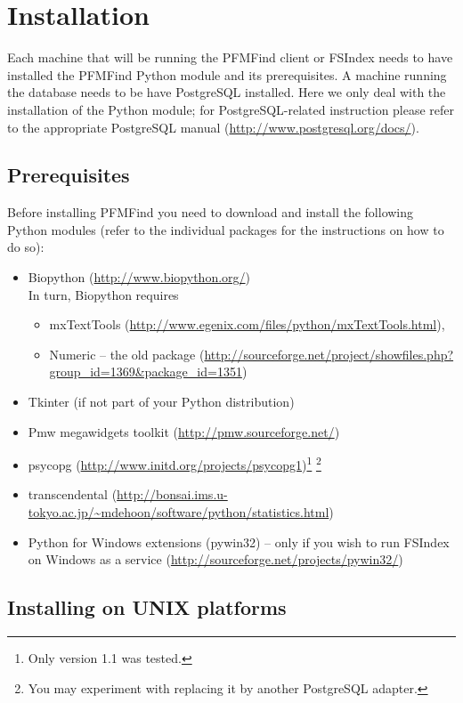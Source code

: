 \documentclass[11pt]{article}
\begin{document}
\section{Installation}

Each machine that will be running the PFMFind client or FSIndex needs to have installed the PFMFind Python module and its prerequisites. A machine running the database needs to be have PostgreSQL installed. Here we only deal with the installation of the Python module; for PostgreSQL-related instruction please refer to the appropriate PostgreSQL manual (\url{http://www.postgresql.org/docs/}).

\subsection{Prerequisites}
Before installing PFMFind you need to download and install the following Python modules (refer to the individual packages for the instructions on how to do so):

\begin{itemize}
\item Biopython (\url{http://www.biopython.org/})\\
In turn, Biopython requires
\begin{itemize}
\item mxTextTools (\url{http://www.egenix.com/files/python/mxTextTools.html}),
\item Numeric -- the old package (\url{http://sourceforge.net/project/showfiles.php?group_id=1369&package_id=1351})
\end{itemize}
\item Tkinter (if not part of your Python distribution)
\item Pmw megawidgets toolkit (\url{http://pmw.sourceforge.net/})
\item psycopg (\url{http://www.initd.org/projects/psycopg1})\footnote{Only version 1.1 was tested.} \footnote{You may experiment with replacing it by another PostgreSQL adapter.}
\item transcendental (\url{http://bonsai.ims.u-tokyo.ac.jp/~mdehoon/software/python/statistics.html})
\item Python for Windows extensions (pywin32) -- only if you wish to run FSIndex on Windows as a service (\url{http://sourceforge.net/projects/pywin32/})
\end{itemize}

\subsection{Installing on UNIX platforms}
\end{document}
